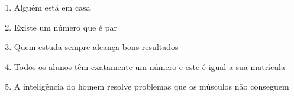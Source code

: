 \documentclass[a4paper,11pt]{article}
\begin{document}
\begin{enumerate}
\begin{enumerate}
\setlength{\itemsep}{-2pt} 
\item Alguém está em casa %
\item Existe um número que é par
\item Quem estuda sempre alcança bons resultados
\item Todos os alunos têm exatamente um número e este é igual a sua matrícula
\item A inteligência do homem resolve problemas que os músculos não conseguem
\end{enumerate}




\end{enumerate}
\end{document}
